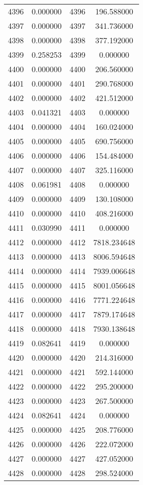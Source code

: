 \documentclass[12pt]{article}
\begin{document}
\begin{longtable}{@{}cccc@{}}
4396 & 0.000000 & 4396 & 196.588000 \\
4397 & 0.000000 & 4397 & 341.736000 \\
4398 & 0.000000 & 4398 & 377.192000 \\
4399 & 0.258253 & 4399 & 0.000000 \\
4400 & 0.000000 & 4400 & 206.560000 \\
4401 & 0.000000 & 4401 & 290.768000 \\
4402 & 0.000000 & 4402 & 421.512000 \\
4403 & 0.041321 & 4403 & 0.000000 \\
4404 & 0.000000 & 4404 & 160.024000 \\
4405 & 0.000000 & 4405 & 690.756000 \\
4406 & 0.000000 & 4406 & 154.484000 \\
4407 & 0.000000 & 4407 & 325.116000 \\
4408 & 0.061981 & 4408 & 0.000000 \\
4409 & 0.000000 & 4409 & 130.108000 \\
4410 & 0.000000 & 4410 & 408.216000 \\
4411 & 0.030990 & 4411 & 0.000000 \\
4412 & 0.000000 & 4412 & 7818.234648 \\
4413 & 0.000000 & 4413 & 8006.594648 \\
4414 & 0.000000 & 4414 & 7939.006648 \\
4415 & 0.000000 & 4415 & 8001.056648 \\
4416 & 0.000000 & 4416 & 7771.224648 \\
4417 & 0.000000 & 4417 & 7879.174648 \\
4418 & 0.000000 & 4418 & 7930.138648 \\
4419 & 0.082641 & 4419 & 0.000000 \\
4420 & 0.000000 & 4420 & 214.316000 \\
4421 & 0.000000 & 4421 & 592.144000 \\
4422 & 0.000000 & 4422 & 295.200000 \\
4423 & 0.000000 & 4423 & 267.500000 \\
4424 & 0.082641 & 4424 & 0.000000 \\
4425 & 0.000000 & 4425 & 208.776000 \\
4426 & 0.000000 & 4426 & 222.072000 \\
4427 & 0.000000 & 4427 & 427.052000 \\
4428 & 0.000000 & 4428 & 298.524000 \\

\end{longtable}
\end{document}
